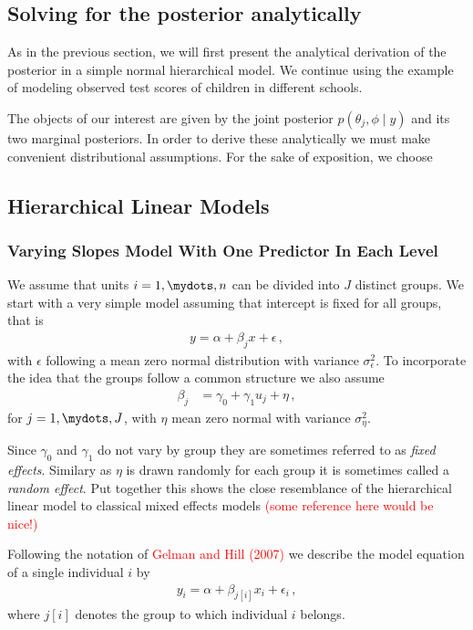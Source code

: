 \subsection{Solving for the posterior analytically}
As in the previous section, we will first present the analytical derivation of
the posterior in a simple normal hierarchical model. We continue using the
example of modeling observed test scores of children in different schools.

The objects of our interest are given by the joint posterior $p(\theta_j, \phi \mid y)$
and its two marginal posteriors. In order to derive these analytically we must
make convenient distributional assumptions. For the sake of exposition, we choose


\subsection{Hierarchical Linear Models}

\subsubsection{Varying Slopes Model With One Predictor In Each Level}
We assume that units $i = 1,\mydots,n$ can be divided into $J$ distinct groups.
We start with a very simple model assuming that intercept is fixed for all
groups, that is
\begin{align}
  y = \alpha + \beta_j x + \epsilon \,,
\end{align}
with $\epsilon$ following a mean zero normal distribution with variance
$\sigma_{\epsilon}^2$.
To incorporate the idea that the groups follow a common structure we also
assume
\begin{align}
  \beta_j &= \gamma_0 + \gamma_1 u_j + \eta \,,
\end{align}
for $j = 1,\mydots,J$, with $\eta$ mean zero normal with variance $\sigma_\eta^2$.

Since $\gamma_0$ and $\gamma_1$ do not vary by group they are sometimes referred
to as \emph{fixed effects}. Similary as $\eta$ is drawn randomly for each group
it is sometimes called a \emph{random effect}. Put together this shows the close
resemblance of the hierarchical linear model to classical mixed effects models
\textcolor{red}{(some reference here would be nice!)}

Following the notation of \textcolor{red}{Gelman and Hill (2007)} we describe the
model equation of a single individual $i$ by
\begin{align}
  y_i = \alpha + \beta_{j[i]} x_i + \epsilon_i \,,
\end{align}
where $j[i]$ denotes the group to which individual $i$ belongs.

